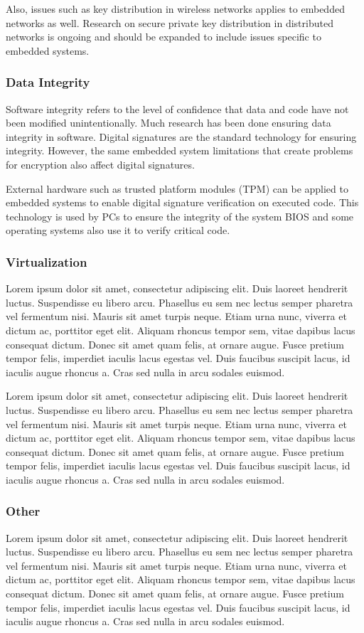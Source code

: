 \documentclass[final,conference,10pt]{IEEEtran}
\begin{document}
Also, issues such as key distribution in wireless networks applies to embedded networks as well.  Research on secure private key distribution in distributed networks is ongoing and should be expanded to include issues specific to embedded systems.

\subsubsection{Data Integrity}
Software integrity refers to the level of confidence that data and code have not been modified unintentionally.  Much research has been done ensuring data integrity in software.  Digital signatures are the standard technology for ensuring integrity. However, the same embedded system limitations that create problems for encryption also affect digital signatures.  

External hardware such as trusted platform modules (TPM) can be applied to embedded systems to enable digital signature verification on executed code.  This technology is used by PCs to ensure the integrity of the system BIOS and some operating systems also use it to verify critical code.  

\subsubsection{Virtualization}
Lorem ipsum dolor sit amet, consectetur adipiscing elit. Duis laoreet hendrerit luctus. Suspendisse eu libero arcu. Phasellus eu sem nec lectus semper pharetra vel fermentum nisi. Mauris sit amet turpis neque. Etiam urna nunc, viverra et dictum ac, porttitor eget elit. Aliquam rhoncus tempor sem, vitae dapibus lacus consequat dictum. Donec sit amet quam felis, at ornare augue. Fusce pretium tempor felis, imperdiet iaculis lacus egestas vel. Duis faucibus suscipit lacus, id iaculis augue rhoncus a. Cras sed nulla in arcu sodales euismod.

Lorem ipsum dolor sit amet, consectetur adipiscing elit. Duis laoreet hendrerit luctus. Suspendisse eu libero arcu. Phasellus eu sem nec lectus semper pharetra vel fermentum nisi. Mauris sit amet turpis neque. Etiam urna nunc, viverra et dictum ac, porttitor eget elit. Aliquam rhoncus tempor sem, vitae dapibus lacus consequat dictum. Donec sit amet quam felis, at ornare augue. Fusce pretium tempor felis, imperdiet iaculis lacus egestas vel. Duis faucibus suscipit lacus, id iaculis augue rhoncus a. Cras sed nulla in arcu sodales euismod.

\subsubsection{Other}
Lorem ipsum dolor sit amet, consectetur adipiscing elit. Duis laoreet hendrerit luctus. Suspendisse eu libero arcu. Phasellus eu sem nec lectus semper pharetra vel fermentum nisi. Mauris sit amet turpis neque. Etiam urna nunc, viverra et dictum ac, porttitor eget elit. Aliquam rhoncus tempor sem, vitae dapibus lacus consequat dictum. Donec sit amet quam felis, at ornare augue. Fusce pretium tempor felis, imperdiet iaculis lacus egestas vel. Duis faucibus suscipit lacus, id iaculis augue rhoncus a. Cras sed nulla in arcu sodales euismod.
\end{document}
